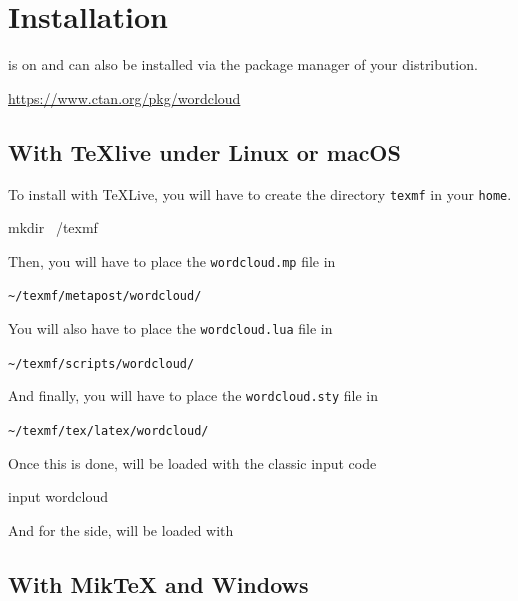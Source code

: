 \documentclass[english]{ltxdoc}
\begin{document}
\section{Installation}

\wordcloudpkg is on \ctan{} and can also be installed via the package manager of your
distribution.

\begin{center}
  \url{https://www.ctan.org/pkg/wordcloud}
\end{center}


\subsection{With \TeX live under Linux or macOS}

To install \wordcloudpkg with \TeX Live, you will have to create the directory
\lstinline+texmf+  in your \lstinline+home+. 

\begin{commandshell}
mkdir ~/texmf
\end{commandshell}

Then, you will have to place the \lstinline+wordcloud.mp+ file in 
\begin{center}
  \verb+~/texmf/metapost/wordcloud/+
\end{center}


You will also have to place the \lstinline+wordcloud.lua+ file in 
\begin{center}
  \verb+~/texmf/scripts/wordcloud/+
\end{center}

And finally, you will have to place the \lstinline+wordcloud.sty+ file in 
\begin{center}
  \verb+~/texmf/tex/latex/wordcloud/+
\end{center}



Once this is done, \wordcloudpkg will be loaded with the classic \MP{}
input code
\begin{mpcode}
input wordcloud
\end{mpcode}

And for the  side, \wordcloudpkg will be loaded with
\begin{latexcode}
\usepackage{wordcloud}
\end{latexcode}

\subsection{With Mik\TeX{} and Windows}
\end{document}
